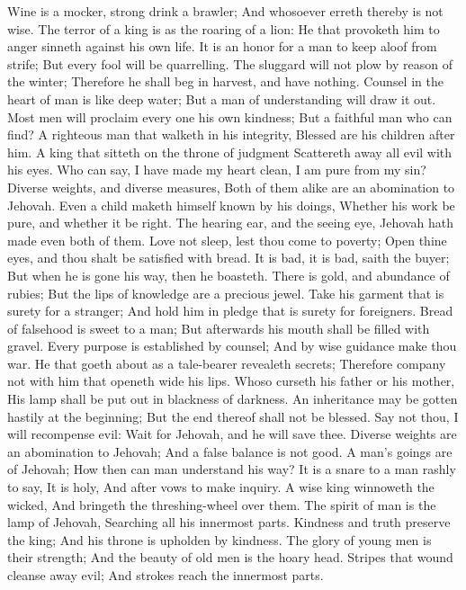 Wine is a mocker, strong drink a brawler; And whosoever erreth thereby is not wise.  The terror of a king is as the roaring of a lion: He that provoketh him to anger sinneth against his own life.  It is an honor for a man to keep aloof from strife; But every fool will be quarrelling.  The sluggard will not plow by reason of the winter; Therefore he shall beg in harvest, and have nothing.  Counsel in the heart of man is like deep water; But a man of understanding will draw it out.  Most men will proclaim every one his own kindness; But a faithful man who can find?  A righteous man that walketh in his integrity, Blessed are his children after him.  A king that sitteth on the throne of judgment Scattereth away all evil with his eyes.  Who can say, I have made my heart clean, I am pure from my sin?  Diverse weights, and diverse measures, Both of them alike are an abomination to Jehovah.  Even a child maketh himself known by his doings, Whether his work be pure, and whether it be right.  The hearing ear, and the seeing eye, Jehovah hath made even both of them.  Love not sleep, lest thou come to poverty; Open thine eyes, and thou shalt be satisfied with bread.  It is bad, it is bad, saith the buyer; But when he is gone his way, then he boasteth.  There is gold, and abundance of rubies; But the lips of knowledge are a precious jewel.  Take his garment that is surety for a stranger; And hold him in pledge that is surety for foreigners.  Bread of falsehood is sweet to a man; But afterwards his mouth shall be filled with gravel.  Every purpose is established by counsel; And by wise guidance make thou war.  He that goeth about as a tale-bearer revealeth secrets; Therefore company not with him that openeth wide his lips.  Whoso curseth his father or his mother, His lamp shall be put out in blackness of darkness.  An inheritance may be gotten hastily at the beginning; But the end thereof shall not be blessed.  Say not thou, I will recompense evil: Wait for Jehovah, and he will save thee.  Diverse weights are an abomination to Jehovah; And a false balance is not good.  A man’s goings are of Jehovah; How then can man understand his way?  It is a snare to a man rashly to say, It is holy, And after vows to make inquiry.  A wise king winnoweth the wicked, And bringeth the threshing-wheel over them.  The spirit of man is the lamp of Jehovah, Searching all his innermost parts.  Kindness and truth preserve the king; And his throne is upholden by kindness.  The glory of young men is their strength; And the beauty of old men is the hoary head.  Stripes that wound cleanse away evil; And strokes reach the innermost parts. 


